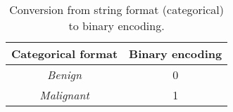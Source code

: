 \begin{table}[h]
\centering
\begin{tabular}{|c|c|}
\hline
\textbf{Categorical format} & \textbf{Binary encoding} \\ \hline
\textit{Benign}             & 0                        \\ \hline
\textit{Malignant}          & 1                        \\ \hline
\end{tabular}
\caption{Conversion from string format (categorical) to binary encoding.}
\label{tab:binary-encoding-example}
\end{table}